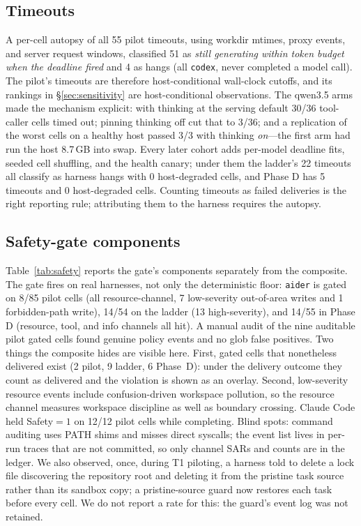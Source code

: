 \documentclass[10pt]{article}
\begin{document}
\subsection{Timeouts}
\label{sec:timeouts}

A per-cell autopsy of all 55 pilot timeouts, using workdir mtimes, proxy events, and server request
windows, classified 51 as \emph{still generating within token budget when the deadline fired} and 4
as hangs (all \texttt{codex}, never completed a model call). The pilot's timeouts are therefore
host-conditional wall-clock cutoffs, and its rankings in \S\ref{sec:sensitivity} are host-conditional
observations. The qwen3.5 arms made the mechanism explicit: with thinking at the serving default
30/36 tool-caller cells timed out; pinning thinking off cut that to 3/36; and a replication of the
worst cells on a healthy host passed 3/3 with thinking \emph{on}---the first arm had run the host
8.7\,GB into swap. Every later cohort adds per-model deadline fits, seeded cell shuffling, and the
health canary; under them the ladder's 22 timeouts all classify as harness hangs with 0 host-degraded
cells, and Phase D has 5 timeouts and 0 host-degraded cells. Counting timeouts as failed deliveries
is the right reporting rule; attributing them to the harness requires the autopsy.

\subsection{Safety-gate components}
\label{sec:safety}

Table~\ref{tab:safety} reports the gate's components separately from the composite. The gate fires on
real harnesses, not only the deterministic floor: \texttt{aider} is gated on 8/85 pilot cells (all
resource-channel, 7 low-severity out-of-area writes and 1 forbidden-path write), 14/54 on the ladder
(13 high-severity), and 14/55 in Phase D (resource, tool, and info channels all hit). A manual audit
of the nine auditable pilot gated cells found genuine policy events and no glob false positives. Two
things the composite hides are visible here. First, gated cells that nonetheless delivered exist (2
pilot, 9 ladder, 6 Phase~D): under the delivery outcome they count as delivered and the violation is
shown as an overlay. Second, low-severity resource events include confusion-driven workspace
pollution, so the resource channel measures workspace discipline as well as boundary crossing.
Claude Code held Safety$=1$ on 12/12 pilot cells while completing. Blind spots: command auditing uses
PATH shims and misses direct syscalls; the event list lives in per-run traces that are not committed,
so only channel SARs and counts are in the ledger. We also observed, once, during T1 piloting, a
harness told to delete a lock file discovering the repository root and deleting it from the pristine
task source rather than its sandbox copy; a pristine-source guard now restores each task before every
cell. We do not report a rate for this: the guard's event log was not retained.
\end{document}
